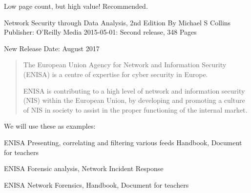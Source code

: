 \documentclass[Screen16to9,17pt]{foils}
\begin{document}


Low page count, but high value! Recommended.

Network Security through Data Analysis, 2nd Edition
By Michael S Collins
Publisher: O'Reilly Media
2015-05-01: Second release, 348 Pages

New Release Date: August 2017





\begin{quote}
  The European Union Agency for Network and Information Security (ENISA) is a centre of expertise for cyber security in Europe.

ENISA is contributing to a high level of network and information security (NIS) within the European Union, by developing and promoting a culture of NIS in society to assist in the proper functioning of the internal market.
\end{quote}



\begin{list2}
\item We will use these as examples:
\item ENISA Presenting, correlating and filtering various feeds Handbook, Document for teachers\\ 
\item ENISA Forensic analysis, Network Incident Response\\ 
\item ENISA Network Forensics, Handbook, Document for teachers\\ 
\end{list2}



\slidenext
\end{document}
